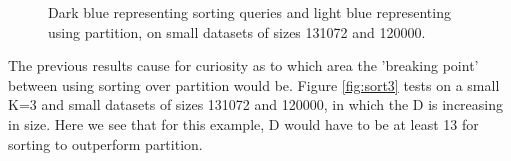 




\begin{figure}[H]
  \centering
  \caption{Dark blue representing sorting queries and light blue representing using partition, on small datasets of sizes 131072 and 120000.}
\label{fig:sort2}
\end{figure}

The previous results cause for curiosity as to which area the ’breaking point’ between using sorting over partition would be. Figure \ref{fig:sort3} tests on a small K=3 and small datasets of sizes 131072 and 120000, in which the D is increasing in size. Here we see that for this example, D would have to be at least 13 for sorting to outperform partition.


